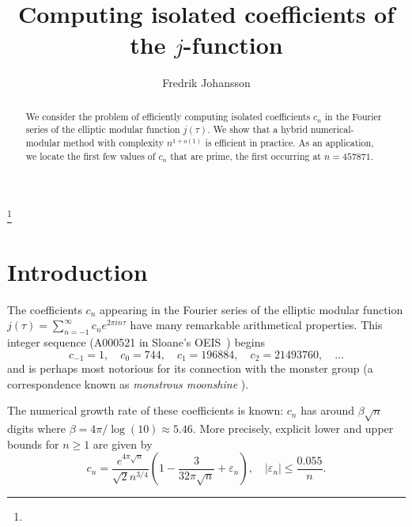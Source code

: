 \documentclass{amsart}
\theoremstyle{definition}
\theoremstyle{remark}
\begin{document}
\title[Computing isolated coefficients of the $j$-function]{Computing isolated coefficients of the $j$-function}


\author{Fredrik Johansson}
\address{Inria Bordeaux-Sud-Ouest and Institut Math.\ Bordeaux,  U. Bordeaux,  Talence, France}
\curraddr{}
\thanks{}


\keywords{}

\date{}

\dedicatory{}

\begin{abstract}
We consider the problem of efficiently computing isolated coefficients $c_n$ in the
Fourier series of the elliptic modular function $j(\tau)$. We show that
a hybrid numerical-modular method with complexity $n^{1+o(1)}$
is efficient in practice.
As an application, we locate
the first few values of $c_n$ that are prime, the first occurring at $n = 457871$.
\end{abstract}

\maketitle

\section{Introduction}

The coefficients $c_n$ appearing in the Fourier series
of the elliptic modular function
$j(\tau) = \sum_{n=-1}^{\infty} c_n e^{2\pi i n \tau}$
have many remarkable arithmetical properties.
This integer sequence (A000521 in Sloane's OEIS~\cite{OEIS000521}) begins
$$c_{-1} = 1, \quad c_0 = 744, \quad c_1 = 196884, \quad c_2 = 21493760, \quad \ldots$$
and is perhaps most notorious
for its connection with the monster group (a correspondence known as \emph{monstrous moonshine} \cite{conway1979monstrous}).

The numerical growth rate of these coefficients is known:
$c_n$ has around $\beta \sqrt{n}$ digits where $\beta = 4 \pi / \log(10) \approx 5.46$.
More precisely, explicit lower and upper bounds for $n \ge 1$ are given by \cite[Theorem~1.1]{Brisebarre2005}
$$c_n = \frac{e^{4 \pi \sqrt{n}}}{\sqrt{2} n^{3/4}} \left(1 - \frac{3}{32 \pi \sqrt{n}} + \varepsilon_n \right), \quad |\varepsilon_n| \le \frac{0.055}{n}.$$
\end{document}
